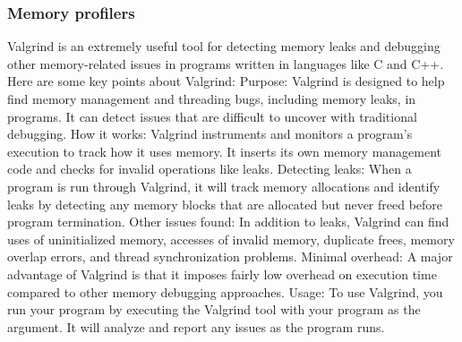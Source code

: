 \documentclass [ titlepage ]{article}
\begin{document}
\subsubsection{Memory profilers}
Valgrind is an extremely useful tool for detecting memory leaks and debugging other memory-related issues in programs written in languages
 like C and C++. Here are some key points about Valgrind: \newline
Purpose: Valgrind is designed to help find memory management and threading bugs, including memory leaks, in programs. It can detect
 issues that are difficult to uncover with traditional debugging.\newline
How it works: Valgrind instruments and monitors a program's execution to track how it uses memory. It inserts its own memory management
 code and checks for invalid operations like leaks. \newline
Detecting leaks: When a program is run through Valgrind, it will track memory allocations and identify leaks by detecting any memory blocks
 that are allocated but never freed before program termination. \newline
Other issues found: In addition to leaks, Valgrind can find uses of uninitialized memory, accesses of invalid memory, duplicate frees, memory
 overlap errors, and thread synchronization problems. \newline
Minimal overhead: A major advantage of Valgrind is that it imposes fairly low overhead on execution time compared to other memory
 debugging approaches. \newline
Usage: To use Valgrind, you run your program by executing the Valgrind tool with your program as the argument. It will analyze and report any
 issues as the program runs. \newline
\end{document}
